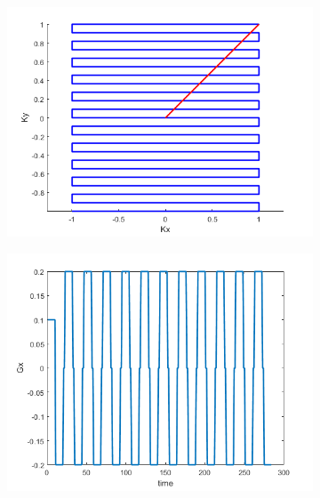 \documentclass[12pt]{article}
\begin{document}
\begin{figure}[H]
\begin{subfigure}{\textwidth}
	
	\includegraphics[width=\textwidth]{Figures/StepK.png}
	\caption{}
	\label{Fig:stepK}
\end{subfigure}
\begin{subfigure}{0.5\textwidth}
	
	\includegraphics[width=\textwidth]{Figures/StepGx.png}
	\caption{}
	\label{Fig:stepGx}
\end{subfigure}
\begin{subfigure}{0.5\textwidth}
	

\end{subfigure}
\end{figure}
\end{document}

